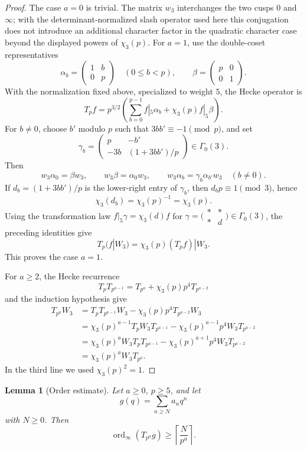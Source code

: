 \documentclass[11pt]{amsart}
\newtheorem{lemma}[theorem]{Lemma}
\theoremstyle{remark}
\DeclareMathOperator{\ord}{ord}
\begin{document}
\begin{proof}
The case $a=0$ is trivial.  The matrix $w_3$ interchanges the two cusps $0$ and $\infty$; with the determinant-normalized slash operator used here this conjugation does not introduce an additional character factor in the quadratic character case beyond the displayed powers of $\chi_3(p)$.  For $a=1$, use the double-coset representatives
\[
 \alpha_b=\begin{pmatrix}1&b\\0&p\end{pmatrix}
 \quad(0\le b<p),
 \qquad
 \beta=\begin{pmatrix}p&0\\0&1\end{pmatrix}.
\]
With the normalization fixed above, specialized to weight $5$, the Hecke operator is
\[
 T_pf=p^{3/2}\left(\sum_{b=0}^{p-1}f|_5\alpha_b+\chi_3(p)f|_5\beta\right).
\]
For $b\ne0$, choose $b'$ modulo $p$ such that $3bb'\equiv-1\pmod p$, and set
\[
 \gamma_b=
 \begin{pmatrix}
 p&-b'\\
 -3b&(1+3bb')/p
 \end{pmatrix}
 \in\Gamma_0(3).
\]
Then
\[
 w_3\alpha_0=\beta w_3,
 \qquad
 w_3\beta=\alpha_0w_3,
 \qquad
 w_3\alpha_b=\gamma_b\alpha_{b'}w_3\quad(b\ne0).
\]
If $d_b=(1+3bb')/p$ is the lower-right entry of $\gamma_b$, then $d_bp\equiv1\pmod3$, hence
\[
 \chi_3(d_b)=\chi_3(p)^{-1}=\chi_3(p).
\]
Using the transformation law $f|_5\gamma=\chi_3(d)f$ for
$\gamma=\bigl(\begin{smallmatrix}*&*\\*&d\end{smallmatrix}\bigr)\in\Gamma_0(3)$, the preceding identities give
\[
 T_p(f|W_3)=\chi_3(p)(T_pf)|W_3.
\]
This proves the case $a=1$.

For $a\ge2$, the Hecke recurrence
\[
 T_pT_{p^{a-1}}=T_{p^a}+\chi_3(p)p^4T_{p^{a-2}}
\]
and the induction hypothesis give
\[
\begin{aligned}
 T_{p^a}W_3
 &=T_pT_{p^{a-1}}W_3-\chi_3(p)p^4T_{p^{a-2}}W_3 \\
 &=\chi_3(p)^{a-1}T_pW_3T_{p^{a-1}}
   -\chi_3(p)^{a-1}p^4W_3T_{p^{a-2}} \\
 &=\chi_3(p)^aW_3T_pT_{p^{a-1}}
   -\chi_3(p)^{a+1}p^4W_3T_{p^{a-2}} \\
 &=\chi_3(p)^aW_3T_{p^a}.
\end{aligned}
\]
In the third line we used $\chi_3(p)^2=1$.
\end{proof}

\begin{lemma}[Order estimate]\label{lem:order-estimate}
Let $a\ge0$, $p\ge5$, and let
\[
 g(q)=\sum_{n\ge N}a_nq^n
\]
with $N\ge0$.  Then
\[
 \ord_\infty(T_{p^a}g)\ge\left\lceil\frac{N}{p^a}\right\rceil.
\]
\end{lemma}
\end{document}
